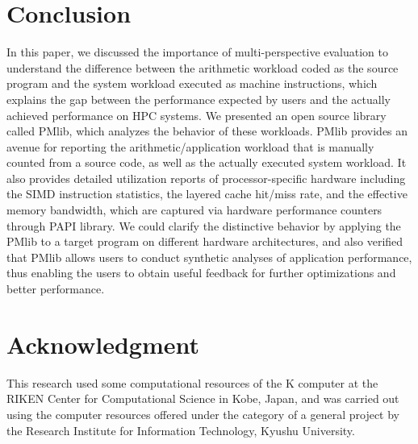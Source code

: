\documentclass[conference]{IEEEtran}
\begin{document}
\section{Conclusion}
In this paper, we discussed the importance of multi-perspective evaluation
to understand the difference between the arithmetic workload coded as
the source program and the system workload executed as machine instructions,
which explains the gap between the performance
expected by users and the actually achieved performance on HPC systems.
We presented an open source library called PMlib, which analyzes the behavior
of these workloads.
PMlib provides an avenue for reporting the arithmetic/application workload
that is manually counted from a source code, as well as the actually executed
system workload.
It also provides detailed utilization reports of processor-specific hardware
including the SIMD instruction statistics, the layered cache
hit/miss rate, and the effective memory bandwidth,
which are captured via hardware performance counters through PAPI library.
We could clarify the distinctive behavior by applying the PMlib to a target
program on different hardware architectures, and also verified that PMlib
allows users to conduct synthetic analyses of application performance,
thus enabling the users to obtain useful feedback for further optimizations
and better performance.

\section*{Acknowledgment}
This research used some computational resources of the K computer at the RIKEN Center for Computational Science in Kobe, Japan, and was carried out using the computer resources offered under the category of a general project by the Research Institute for Information Technology, Kyushu University.


\end{document}
